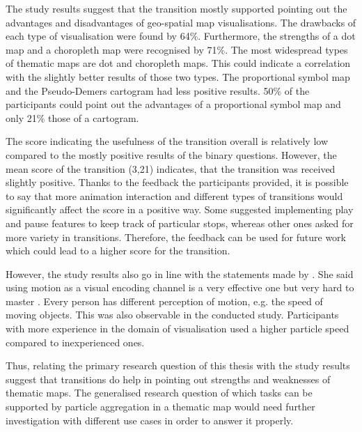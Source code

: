 \cbstart
The study results suggest that the transition mostly supported pointing out the advantages and disadvantages of geo-spatial map visualisations. The drawbacks of each type of visualisation were found by 64\%. Furthermore, the strengths of a dot map and a choropleth map were recognised by 71\%. The most widespread types of thematic maps are dot and choropleth maps. This could indicate a correlation with the slightly better results of those two types. The proportional symbol map and the Pseudo-Demers cartogram had less positive results. 50\% of the participants could point out the advantages of a proportional symbol map and only 21\% those of a cartogram.
\cbend

The score indicating the usefulness of the transition overall is relatively low compared to the mostly positive results of the binary questions. However, the mean score of the transition (3,21) indicates, that the transition was received slightly positive. Thanks to the feedback the participants provided, it is possible to say that more animation interaction and different types of transitions would significantly affect the score in a positive way. Some suggested implementing play and pause features to keep track of particular stops, whereas other ones asked for more variety in transitions. Therefore, the feedback can be used for future work which could lead to a higher score for the transition.

However, the study results also go in line with the statements made by \citeauthor{Munzner2014}. She said using motion as a visual encoding channel is a very effective one but very hard to master . Every person has different perception of motion, e.g. the speed of moving objects. This was also observable in the conducted study. Participants with more experience in the domain of visualisation used a higher particle speed compared to inexperienced ones.

Thus, relating the primary research question of this thesis with the study results suggest that transitions do help in pointing out strengths and weaknesses of thematic maps. The generalised research question of which tasks can be supported by particle aggregation in a thematic map would need further investigation with different use cases in order to answer it properly.